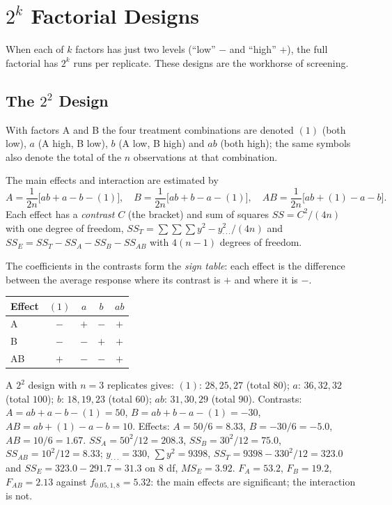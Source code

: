 \section{$2^k$ Factorial Designs}

When each of $k$ factors has just two levels (``low'' $-$ and ``high'' $+$), the full factorial has $2^k$ runs per replicate. These designs are the workhorse of screening.

\subsection{The $2^2$ Design}

With factors A and B the four treatment combinations are denoted $(1)$ (both low), $a$ (A high, B low), $b$ (A low, B high) and $ab$ (both high); the same symbols also denote the total of the $n$ observations at that combination.

\begin{theorem}\label{thm:2k2}
The main effects and interaction are estimated by
\[ A=\frac1{2n}\big[ab+a-b-(1)\big],\quad B=\frac1{2n}\big[ab+b-a-(1)\big],\quad AB=\frac1{2n}\big[ab+(1)-a-b\big]. \]
Each effect has a \emph{contrast} $C$ (the bracket) and sum of squares $SS=C^2/(4n)$ with one degree of freedom, $SS_T=\sum\sum\sum y^2-y_{\cdot\cdot\cdot}^2/(4n)$ and $SS_E=SS_T-SS_A-SS_B-SS_{AB}$ with $4(n-1)$ degrees of freedom.
\end{theorem}

The coefficients in the contrasts form the \emph{sign table}: each effect is the difference between the average response where its contrast is $+$ and where it is $-$.

\begin{center}
\begin{tabular}{l|cccc}
\toprule
Effect & $(1)$ & $a$ & $b$ & $ab$\\
\midrule
A & $-$ & $+$ & $-$ & $+$\\
B & $-$ & $-$ & $+$ & $+$\\
AB & $+$ & $-$ & $-$ & $+$\\
\bottomrule
\end{tabular}
\end{center}

\begin{example}\label{ex:22}
A $2^2$ design with $n=3$ replicates gives: $(1)$: $28,25,27$ (total $80$); $a$: $36,32,32$ (total $100$); $b$: $18,19,23$ (total $60$); $ab$: $31,30,29$ (total $90$). Contrasts: $A=ab+a-b-(1)=50$, $B=ab+b-a-(1)=-30$, $AB=ab+(1)-a-b=10$. Effects: $A=50/6=8.33$, $B=-30/6=-5.0$, $AB=10/6=1.67$. $SS_A=50^2/12=208.3$, $SS_B=30^2/12=75.0$, $SS_{AB}=10^2/12=8.33$; $y_{\cdot\cdot\cdot}=330$, $\sum y^2=9398$, $SS_T=9398-330^2/12=323.0$ and $SS_E=323.0-291.7=31.3$ on $8$ df, $MS_E=3.92$. $F_A=53.2$, $F_B=19.2$, $F_{AB}=2.13$ against $f_{0.05,1,8}=5.32$: the main effects are significant; the interaction is not.
\end{example}

